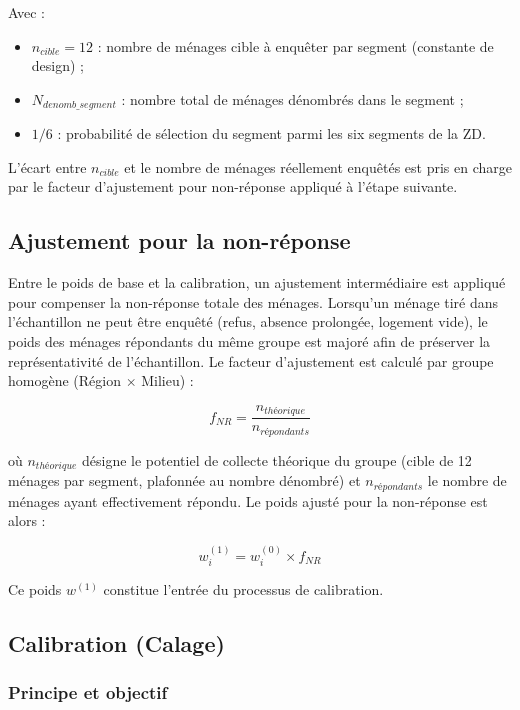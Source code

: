 \documentclass[12pt, a4paper]{article}
\begin{document}
Avec :
\begin{itemize}[noitemsep]
  \item $n_{cible} = 12$ : nombre de ménages cible à enquêter par segment (constante de design) ;
  \item $N_{denomb\_segment}$ : nombre total de ménages dénombrés dans le segment ;
  \item $1/6$ : probabilité de sélection du segment parmi les six segments de la ZD.
\end{itemize}

L'écart entre $n_{cible}$ et le nombre de ménages réellement enquêtés est pris en charge par le facteur d'ajustement pour non-réponse appliqué à l'étape suivante.

\subsection{Ajustement pour la non-réponse}

Entre le poids de base et la calibration, un ajustement intermédiaire est appliqué pour compenser la non-réponse totale des ménages. Lorsqu'un ménage tiré dans l'échantillon ne peut être enquêté (refus, absence prolongée, logement vide), le poids des ménages répondants du même groupe est majoré afin de préserver la représentativité de l'échantillon. Le facteur d'ajustement est calculé par groupe homogène (Région $\times$ Milieu) :

\begin{equation}
  f_{NR} = \frac{n_{théorique}}{n_{répondants}}
\end{equation}

où $n_{théorique}$ désigne le potentiel de collecte théorique du groupe (cible de 12 ménages par segment, plafonnée au nombre dénombré) et $n_{répondants}$ le nombre de ménages ayant effectivement répondu. Le poids ajusté pour la non-réponse est alors :

\begin{equation}
  w^{(1)}_i = w^{(0)}_i \times f_{NR}
\end{equation}

Ce poids $w^{(1)}$ constitue l'entrée du processus de calibration.

\subsection{Calibration (Calage)}

\subsubsection{Principe et objectif}
\end{document}
